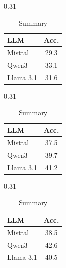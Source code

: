     \begin{table}[h]
        \centering
        \footnotesize 
        \setlength{\tabcolsep}{5pt} 
        \begin{subtable}[t]{0.31\textwidth}
            \centering
            \begin{tabular}{lc}
                \toprule
                \rowcolor[gray]{0.9} \textbf{LLM} & \textbf{Acc.} \\
                \midrule
                Mistral & 29.3 \\
                Qwen3 & 33.1 \\
                Llama 3.1 & 31.6 \\
                \bottomrule
            \end{tabular}
            \caption{Blind Test}
        \end{subtable}
        \hfill
        \begin{subtable}[t]{0.31\textwidth}
            \centering
            \begin{tabular}{lc}
                \toprule
                \rowcolor[gray]{0.9} \textbf{LLM} & \textbf{Acc.} \\
                \midrule
                Mistral & 37.5 \\
                Qwen3 & 39.7 \\
                Llama 3.1 & 41.2 \\
                \bottomrule
            \end{tabular}
            \caption{Audio}
        \end{subtable}
        \hfill
        \begin{subtable}[t]{0.31\textwidth}
            \centering
            \begin{tabular}{lc}
                \toprule
                \rowcolor[gray]{0.9} \textbf{LLM} & \textbf{Acc.} \\
                \midrule
                Mistral & 38.5 \\
                Qwen3 & 42.6 \\
                Llama 3.1 & 40.5 \\
                \bottomrule
            \end{tabular}
            \caption{Summary}
        \end{subtable}
    
        \vspace{0.2em} 
    


\end{table}
